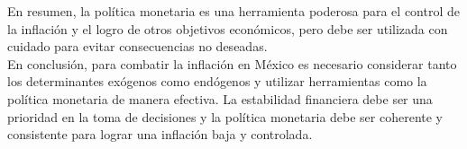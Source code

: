 En resumen, la política monetaria es una herramienta poderosa para el control de la inflación y el logro de otros objetivos económicos, pero debe ser utilizada con cuidado para evitar consecuencias no deseadas.\\

En conclusión, para combatir la inflación en México es necesario considerar tanto los determinantes exógenos como endógenos y utilizar herramientas como la política monetaria de manera efectiva. La estabilidad financiera debe ser una prioridad en la toma de decisiones y la política monetaria debe ser coherente y consistente para lograr una inflación baja y controlada.\\